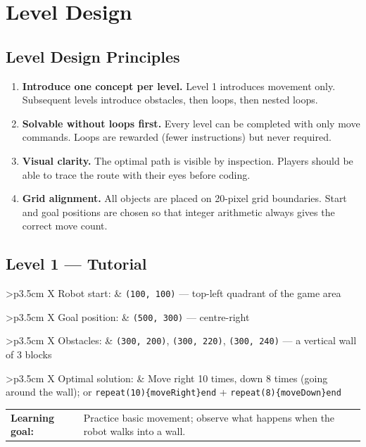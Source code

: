 \documentclass[12pt,a4paper]{article}
\newcommand{\gddfield}[2]{%
  \noindent\begin{tabularx}{\linewidth}{>{\bfseries\color{accent}\sffamily}p{3.5cm} X}
    #1 & #2
  \end{tabularx}\smallskip}
\begin{document}
\section{Level Design}

\subsection{Level Design Principles}

\begin{tcolorbox}[gddbox, title={Level Design Philosophy}]
\begin{enumerate}[label=\textbf{P\arabic*.}, leftmargin=3em, noitemsep]
  \item \textbf{Introduce one concept per level.} Level 1 introduces movement only. Subsequent levels introduce obstacles, then loops, then nested loops.
  \item \textbf{Solvable without loops first.} Every level can be completed with only move commands. Loops are rewarded (fewer instructions) but never required.
  \item \textbf{Visual clarity.} The optimal path is visible by inspection. Players should be able to trace the route with their eyes before coding.
  \item \textbf{Grid alignment.} All objects are placed on 20-pixel grid boundaries. Start and goal positions are chosen so that integer arithmetic always gives the correct move count.
\end{enumerate}
\end{tcolorbox}

\subsection{Level 1 — Tutorial}

\begin{tcolorbox}[gddbox, title={Level 1 Specification}]
\gddfield{Robot start:}{\texttt{(100, 100)} — top-left quadrant of the game area}
\gddfield{Goal position:}{\texttt{(500, 300)} — centre-right}
\gddfield{Obstacles:}{\texttt{(300, 200)}, \texttt{(300, 220)}, \texttt{(300, 240)} — a vertical wall of 3 blocks}
\gddfield{Optimal solution:}{Move right 10 times, down 8 times (going around the wall); or \texttt{repeat(10)\{moveRight\}end} + \texttt{repeat(8)\{moveDown\}end}}
\gddfield{Learning goal:}{Practice basic movement; observe what happens when the robot walks into a wall.}
\end{tcolorbox}
\end{document}

